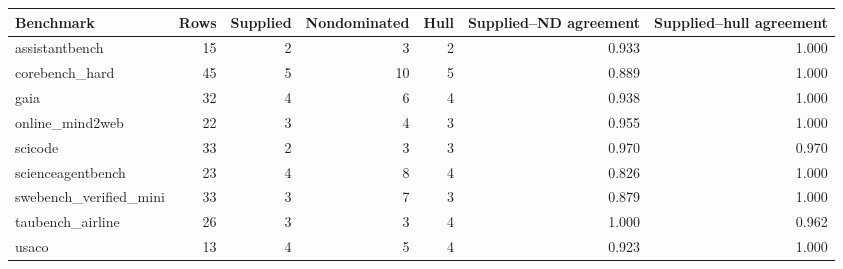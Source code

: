 \begin{tabular}{lrrrrrr}
\toprule
Benchmark & Rows & Supplied & Nondominated & Hull & Supplied--ND agreement & Supplied--hull agreement \\
\midrule
assistantbench & 15 & 2 & 3 & 2 & 0.933 & 1.000 \\
corebench\_hard & 45 & 5 & 10 & 5 & 0.889 & 1.000 \\
gaia & 32 & 4 & 6 & 4 & 0.938 & 1.000 \\
online\_mind2web & 22 & 3 & 4 & 3 & 0.955 & 1.000 \\
scicode & 33 & 2 & 3 & 3 & 0.970 & 0.970 \\
scienceagentbench & 23 & 4 & 8 & 4 & 0.826 & 1.000 \\
swebench\_verified\_mini & 33 & 3 & 7 & 3 & 0.879 & 1.000 \\
taubench\_airline & 26 & 3 & 3 & 4 & 1.000 & 0.962 \\
usaco & 13 & 4 & 5 & 4 & 0.923 & 1.000 \\
\bottomrule
\end{tabular}
